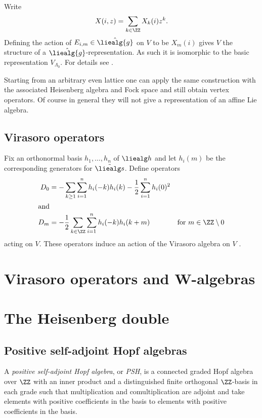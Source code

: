 \documentclass{ck-article}
\newcommand\affliealg[1]{\hat{\liealg{#1}}}
\begin{document}
Write
\[
    X(i, z) = \sum_{k \in \ZZ} X_k(i) z^k.
\]
Defining the action of $E_{i,m} \in \affliealg g$ on $V$ to be $X_m(i)$ gives $V$ the structure of a $\affliealg g$-representation.
As such it is isomorphic to the basic representation $V_{\Lambda_0}$.
For details see \cite[Theorem~1]{FrenkelKac:1980:BasicRepresentationsOfAffineLieAlgebras}.

\begin{Remark}
    Starting from an arbitrary even lattice one can apply the same construction with the associated Heisenberg algebra and Fock space and still obtain vertex operators.
    Of course in general they will not give a representation of an affine Lie algebra.
\end{Remark}

\subsection{Virasoro operators}

Fix an orthonormal basis $h_1,\dotsc, h_n$ of $\liealg h$ and let $h_i(m)$ be the corresponding generators for $\tilde{\liealg s}$.
Define operators
\begin{align*}
    D_0 &= -\sum_{k \ge 1} \sum_{i=1}^n h_i(-k)h_i(k) - \frac12\sum_{i=1}^n h_i(0)^2 \\
    \intertext{and}
    D_m &= -\frac12 \sum_{k \in \ZZ} \sum_{i=1}^n h_i(-k)h_i(k+m)& \text{for } m \in \ZZ \setminus 0
\end{align*}
acting on $V$.
These operators induce an action of the Virasoro algebra on $V$ \cite[Proposition~2.7]{FrenkelKac:1980:BasicRepresentationsOfAffineLieAlgebras}.

\section{Virasoro operators and W-algebras}

\section{The Heisenberg double}

\subsection{Positive self-adjoint Hopf algebras}

\begin{Definition}
    A \emph{positive self-adjoint Hopf algebra}, or \emph{PSH}, is a connected graded Hopf algebra over $\ZZ$ with an inner product and a distinguished finite orthogonal $\ZZ$-basis in each grade such that multiplication and comultiplication are adjoint and take elements with positive coefficients in the basis to elements with positive coefficients in the basis.
\end{Definition}
\end{document}
